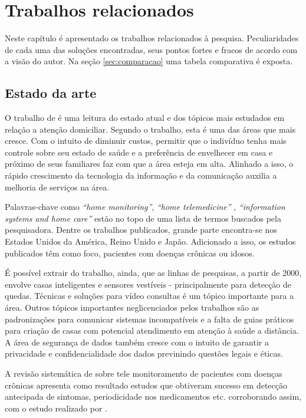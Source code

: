 \chapter{Trabalhos relacionados}\label{cap:trabalhos-relacionados}

Neste capítulo é apresentado os trabalhos relacionados à pesquisa. Peculiaridades
de cada uma das soluções encontradas, seus pontos fortes e fracos de acordo com
a visão do autor. Na seção \ref{sec:comparacao} uma tabela comparativa é exposta.

\section{Estado da arte} \label{sec:estado-da-arte}

O trabalho de  é uma leitura do estado atual e dos
tópicos mais estudados em relação a atenção domiciliar. Segundo o trabalho,
esta é uma das áreas que mais cresce. Com o intuito de diminuir custos,
permitir que o indivíduo tenha mais controle sobre seu estado de saúde e a
preferência de envelhecer em casa e próximo de seus familiares faz com que a
área esteja em alta. Alinhado a isso, o rápido crescimento da tecnologia da
informação e da comunicação auxilia a melhoria de serviços na área.

Palavras-chave como \textit{``home monitoring''}, \textit{``home
telemedicine''} , \textit{``information systems and home care''} estão no topo
de uma lista de termos buscados pela pesquisadora. Dentre os trabalhos
publicados, grande parte encontra-se nos Estados Unidos da América, Reino Unido
e Japão. Adicionado a isso, os estudos publicados têm como foco, pacientes com
doenças crônicas ou idosos.

É possível extrair do trabalho, ainda, que as linhas de pesquisas, a partir de
2000, envolve casas inteligentes e sensores vestíveis - principalmente para
detecção de quedas. Técnicas e soluções para vídeo consultas é um tópico
importante para a área. Outros tópicos importantes neglicenciados pelos
trabalhos são as padronizações para comunicar sistemas incompatíveis e a falta
de guias práticos para criação de casas com potencial atendimento em atenção à
saúde a distância. A área de segurança de dados também cresce com o intuito de
garantir a privacidade e confidencialidade dos dados previnindo questões legais
e éticas.

A revisão sistemática de  sobre tele
monitoramento de pacientes com doenças crônicas apresenta como resultado
estudos que obtiveram sucesso em detecção antecipada de sintomas, periodicidade
nos medicamentos etc.  corroborando assim, com o estudo realizado por
.

